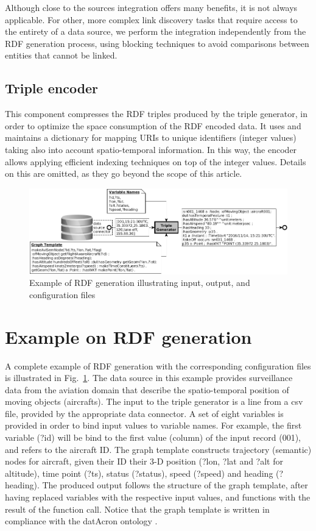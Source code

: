 \documentclass{sig-alternate}
\makeatletter
\def\maxwidth#1{\ifdim\Gin@nat@width>#1 #1\else\Gin@nat@width\fi}
\makeatother
\begin{document}
Although close to the sources integration offers many benefits, it is not always applicable. For other, more complex link discovery tasks that require access to the entirety of a data source, we perform the integration independently from the RDF generation process, using blocking techniques to avoid comparisons between entities that cannot be linked.

\subsection{Triple encoder}

This component compresses the RDF triples produced by the triple generator, in order to optimize the space consumption of the RDF encoded data. It uses and maintains a dictionary for mapping URIs to unique identifiers (integer values) taking also into account spatio-temporal information.  In this way, the encoder allows applying efficient indexing techniques on top of the integer values. Details on this are omitted, as they go beyond the scope of this article.
\begin{figure}[h!]
\centering
\includegraphics[width=\maxwidth{\columnwidth}]{./img/image2.png}
\cprotect\caption{  Example of RDF generation illustrating input, output, and configuration files}
\label{_Ref490495945}
\end{figure}


\section{Example on RDF generation}

A complete example of RDF generation with the corresponding configuration files is illustrated in Fig.~\ref{_Ref490495945}. The data source in this example provides surveillance data from the aviation domain that describe the spatio-temporal position of moving objects (aircrafts). The input to the triple generator is a line from a csv file, provided by the appropriate data connector. A set of eight variables is provided in order to bind input values to variable names. For example, the first variable (?id) will be bind to the first value (column) of the input record (001), and refers to the aircraft ID. The graph template constructs trajectory (semantic) nodes for aircraft, given their ID their 3-D position (?lon, ?lat and ?alt for altitude), time point (?ts), status (?status), speed (?speed) and heading (?heading). The produced output follows the structure of the graph template, after having replaced variables with the respective input values, and functions with the result of the function call. Notice that the graph template is written in compliance with the datAcron ontology  \cite{_Ref490495645}.
\end{document}
